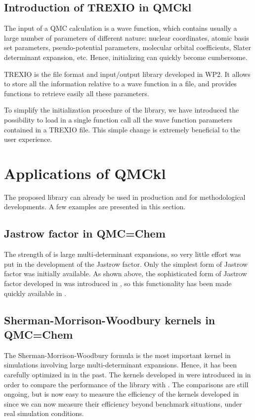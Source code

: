 \subsection{Introduction of TREXIO in QMCkl}

The input of a \ac{QMC} calculation is a wave function, which
contains usually a large number of parameters of different nature:
nuclear coordinates, atomic basis set parameters, pseudo-potential
parameters, molecular orbital coefficients, Slater determinant
expansion, etc.
Hence, initializing \QMCkl{} can quickly become cumbersome.

\ac{TREXIO} is the file format and input/output library developed in
\ac{WP}2. It allows to store all the information relative to a wave
function in a file, and provides functions to retrieve easily all
these parameters. 

To simplify the initialization procedure of the library, we have
introduced the possibility to load in a single function call all the
wave function parameters contained in a \ac{TREXIO} file. This simple
change is extremely beneficial to the user experience.


\section{Applications of QMCkl}

The proposed library can already be used in production and for
methodological developments. A few examples are presented in this section.

\subsection{Jastrow factor in QMC=Chem}

The strength of \qmcchem{} is large multi-determinant expansions, so very
little effort was put in the development of the Jastrow factor. Only the
simplest form of Jastrow factor was initially available. As shown above, the
sophisticated form of Jastrow factor developed in \champ{} was introduced
in \QMCkl{}, so this functionality has been made quickly available
in \qmcchem{}.

\subsection{Sherman-Morrison-Woodbury kernels in QMC=Chem}

The Sherman-Morrison-Woodbury formula is the most important kernel in
simulations involving large multi-determinant expansions. Hence, it has
been carefully optimized in \qmcchem{} in the past. The kernels
developed in \QMCkl{} were introduced in \qmcchem{} in order
to compare the performance of the library with \qmcchem{}. The
comparisons are still ongoing, but is now easy to measure the
efficiency of the kernels developed in \QMCkl{} since we can now
measure their efficiency beyond benchmark situations, under real
simulation conditions.

